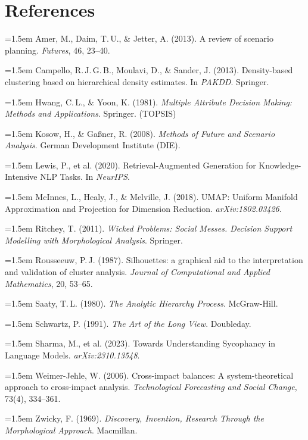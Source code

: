 \documentclass[11pt,a4paper]{article}
\newcommand{\refitem}[1]{\par\noindent\hangindent=1.5em\hangafter=1 #1\par\smallskip}
\begin{document}
\section*{References}
\small
\refitem{Amer, M., Daim, T.\,U., \& Jetter, A. (2013). A review of scenario planning. \textit{Futures}, 46, 23--40.}
\refitem{Campello, R.\,J.\,G.\,B., Moulavi, D., \& Sander, J. (2013). Density-based clustering based on hierarchical density estimates. In \textit{PAKDD}. Springer.}
\refitem{Hwang, C.\,L., \& Yoon, K. (1981). \textit{Multiple Attribute Decision Making: Methods and Applications}. Springer. (TOPSIS)}
\refitem{Kosow, H., \& Gaßner, R. (2008). \textit{Methods of Future and Scenario Analysis}. German Development Institute (DIE).}
\refitem{Lewis, P., et al. (2020). Retrieval-Augmented Generation for Knowledge-Intensive NLP Tasks. In \textit{NeurIPS}.}
\refitem{McInnes, L., Healy, J., \& Melville, J. (2018). UMAP: Uniform Manifold Approximation and Projection for Dimension Reduction. \textit{arXiv:1802.03426}.}
\refitem{Ritchey, T. (2011). \textit{Wicked Problems: Social Messes. Decision Support Modelling with Morphological Analysis}. Springer.}
\refitem{Rousseeuw, P.\,J. (1987). Silhouettes: a graphical aid to the interpretation and validation of cluster analysis. \textit{Journal of Computational and Applied Mathematics}, 20, 53--65.}
\refitem{Saaty, T.\,L. (1980). \textit{The Analytic Hierarchy Process}. McGraw-Hill.}
\refitem{Schwartz, P. (1991). \textit{The Art of the Long View}. Doubleday.}
\refitem{Sharma, M., et al. (2023). Towards Understanding Sycophancy in Language Models. \textit{arXiv:2310.13548}.}
\refitem{Weimer-Jehle, W. (2006). Cross-impact balances: A system-theoretical approach to cross-impact analysis. \textit{Technological Forecasting and Social Change}, 73(4), 334--361.}
\refitem{Zwicky, F. (1969). \textit{Discovery, Invention, Research Through the Morphological Approach}. Macmillan.}
\end{document}
